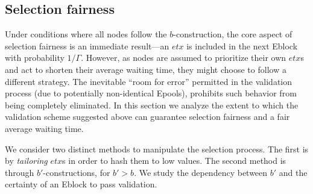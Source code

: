 \subsection{Selection fairness}\label{subsec:selectionFairness}



Under conditions where all nodes follow the $b$-construction, the core aspect of selection fairness is an immediate result---an $etx$ is included in the next Eblock with probability $1/\Gamma$. However, as nodes are assumed to prioritize their own $etx$s and act to shorten their average waiting time, they might choose to follow a different strategy. The inevitable ``room for error'' permitted in the validation process (due to potentially non-identical Epools), prohibits such behavior from being completely eliminated. In this section we analyze the extent to which the validation scheme suggested above can guarantee selection fairness and a fair average waiting time.

We consider two distinct methods to manipulate the selection process.
The first is by \emph{tailoring} $etx$s in order to hash them to low values. %
The second method is through $b'$-constructions, for $b'>b$. We study the dependency between $b'$ and the certainty of an Eblock to pass validation. %


